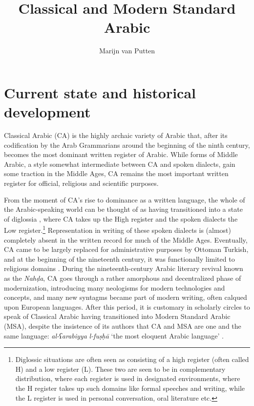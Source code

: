 \documentclass[output=paper]{langsci/langscibook}
\author{Marijn van Putten\affiliation{University of Leiden}}
\title{Classical and Modern Standard Arabic}
\begin{document}
\maketitle 
\let\textstyleannotationreference\relax{}
\section{Current state and historical development}

Classical Arabic (CA) is the highly archaic variety of Arabic that, after its codification by the Arab Grammarians around the beginning of the ninth century, becomes the most dominant written register of Arabic. While forms of Middle Arabic, a style somewhat intermediate between CA and spoken dialects, gain some traction in the Middle Ages, CA remains the most important written register for official, religious and scientific purposes. 

From the moment of CA’s rise to dominance as a written language, the whole of the Arabic-speaking world can be thought of as having transitioned into a state of diglossia \citep{Ferguson1959,Ferguson1996}, where CA takes up the High register and the spoken dialects the Low register.\footnote{Diglossic situations are often seen as consisting of a high register (often called H) and a low register (L). These two are seen to be in complementary distribution, where each register is used in designated environments, where the H register takes up such domains like formal speeches and writing, while the L register is used in personal conversation, oral literature etc.} Representation in writing of these spoken dialects is (almost) completely absent in the written record for much of the Middle Ages. Eventually, CA came to be largely replaced for administrative purposes by Ottoman Turkish, and at the beginning of the nineteenth century, it was functionally limited to religious domains \citep[836]{Glaß2011}. During the nineteenth-century Arabic literary revival known as the \textit{Nahḍa}, CA goes through a rather amorphous and decentralized phase of modernization, introducing many neologisms for modern technologies and concepts, and many new syntagms became part of modern writing, often calqued upon European languages. After this period, it is customary in scholarly circles to speak of Classical Arabic having transitioned into Modern Standard Arabic (MSA), despite the insistence of its authors that CA and MSA are one and the same language: \textit{al-ʕarabiyya} \textit{l-fuṣḥā} ‘the most eloquent Arabic language’ \citep[845]{Ryding2011}.
\end{document}
